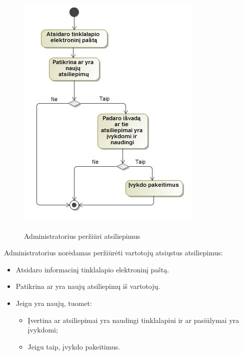 \documentclass{VUMIFPSkursinis}
\begin{document}
\begin{figure}[H]
    \centering
    \includegraphics[scale=0.7]{img/geri/adminFeed}
    \label{img:uml15_5}
	\caption{Administratorius peržiūri atsiliepimus}
\end{figure}

Administratorius norėdamas peržiūrėti vartotojų atsiųstus atsiliepimus:
\begin{itemize}
\item Atsidaro informacinį tinklalapio elektroninį paštą.
\item Patikrina ar yra naujų atsiliepimų iš vartotojų.
\item Jeigu yra naujų, tuomet:
\begin{itemize}
\item Įvertina ar atsiliepimai yra naudingi tinklalapiui ir ar pasiūlymai yra įvykdomi;
\item Jeigu taip, įvykdo pakeitimus.
\end{itemize}
\end{itemize}
\end{document}
